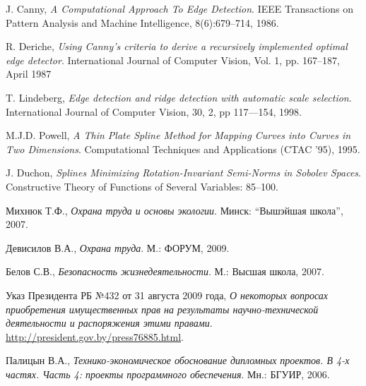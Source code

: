 \begin{thebibliography}{99}
  J. Canny,
  \emph{A Computational Approach To Edge Detection}.
  IEEE Transactions on Pattern Analysis and Machine Intelligence, 8(6):679–714,
  1986.

  R. Deriche,
  \emph{Using Canny's criteria to derive a recursively implemented optimal edge detector}.
  International Journal of Computer Vision, Vol. 1, pp. 167–187,
  April 1987

  T. Lindeberg,
  \emph{Edge detection and ridge detection with automatic scale selection}.
  International Journal of Computer Vision, 30, 2, pp 117—154,
  1998.

  M.J.D. Powell,
  \emph{A Thin Plate Spline Method for Mapping Curves into Curves in Two Dimensions}.
  Computational Techniques and Applications (CTAC '95),
  1995.

  J. Duchon,
  \emph{Splines Minimizing Rotation-Invariant Semi-Norms in Sobolev Spaces}.
  Constructive Theory of Functions of Several Variables: 85–100.

  Михнюк Т.Ф.,
  \emph{Охрана труда и основы экологии}.
  Минск: ``Вышэйшая школа'',
  2007.

  Девисилов В.А.,
  \emph{Охрана труда}.
  М.: ФОРУМ,
  2009.

  Белов С.В.,
  \emph{Безопасность жизнедеятельности}.
  М.: Высшая школа,
  2007.

  Указ Президента РБ №432 от 31 августа 2009 года,
  \emph{О некоторых вопросах приобретения имущественных прав на результаты научно-технической деятельности и распоряжения этими правами}.
  \href{http://president.gov.by/press76885.html}{http://president.gov.by/press76885.html}.

  Палицын В.А.,
  \emph{Технико-экономическое обоснование дипломных проектов. В 4-х частях. Часть 4: проекты программного обеспечения}.
  Мн.: БГУИР,
  2006.

\end{thebibliography}
